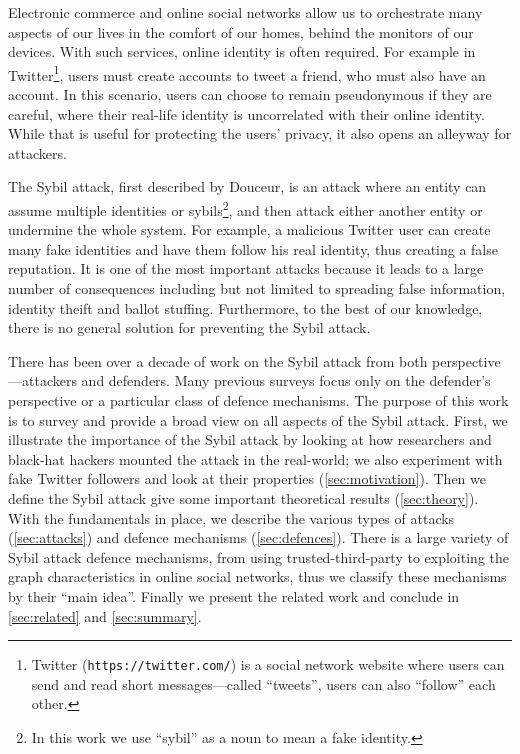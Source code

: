 Electronic commerce and online social networks allow us to orchestrate many
aspects of our lives in the comfort of our homes, behind the monitors of our
devices. With such services, online identity is often required. For example in
Twitter\footnote{Twitter (\texttt{https://twitter.com/}) is a social network website
  where users can send and read short messages---called ``tweets'', users can
  also ``follow'' each other.}, users must create accounts to tweet a friend,
who must also have an account. In this scenario, users can choose to remain
pseudonymous if they are careful, where their real-life identity is uncorrelated
with their online identity. While that is useful for protecting the users'
privacy, it also opens an alleyway for attackers.

The Sybil attack, first described by Douceur\cite{douceur2002sybil}, is an
attack where an entity can assume multiple identities or sybils\footnote{In this
  work we use ``sybil'' as a noun to mean a fake identity.}, and then attack
either another entity or undermine the whole system. For example, a malicious
Twitter user can create many fake identities and have them follow his real
identity, thus creating a false reputation. It is one of the most important
attacks because it leads to a large number of consequences including but not
limited to spreading false information, identity theift\cite{bilge2009all} and
ballot stuffing\cite{bhattacharjee2005avoiding}. Furthermore, to the best of our
knowledge, there is no general solution for preventing the Sybil attack.

There has been over a decade of work on the Sybil attack from both
perspective---attackers and defenders. Many previous surveys focus only on the
defender's perspective or a particular class of defence mechanisms. The purpose
of this work is to survey and provide a broad view on all aspects of the Sybil
attack. First, we illustrate the importance of the Sybil attack by looking at
how researchers and black-hat hackers mounted the attack in the real-world; we
also experiment with fake Twitter followers and look at their properties
(\autoref{sec:motivation}). Then we define the Sybil attack give some important
theoretical results (\autoref{sec:theory}). With the fundamentals in place, we
describe the various types of attacks (\autoref{sec:attacks}) and defence
mechanisms (\autoref{sec:defences}). There is a large variety of Sybil attack
defence mechanisms, from using trusted-third-party to exploiting the graph
characteristics in online social networks, thus we classify these mechanisms by
their ``main idea''. Finally we present the related work and conclude in
\autoref{sec:related} and \autoref{sec:summary}.

